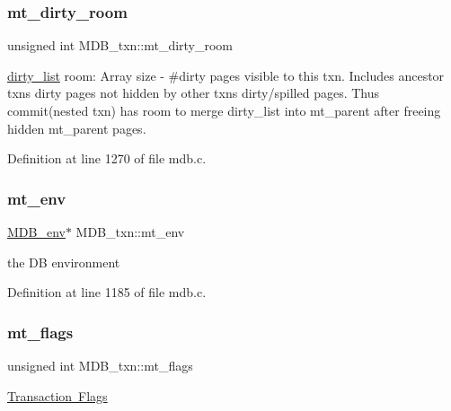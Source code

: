 \mbox{\label{struct_m_d_b__txn_ab62f1ad8141d56c66c8548934b7e0977}} 
\subsubsection{\texorpdfstring{mt\+\_\+dirty\+\_\+room}{mt\_dirty\_room}}
{\footnotesize\ttfamily unsigned int M\+D\+B\+\_\+txn\+::mt\+\_\+dirty\+\_\+room}

\mbox{\hyperlink{struct_m_d_b__txn_a0a89cc7b39f5aec84f629a2b43bb64d5}{dirty\+\_\+list}} room\+: Array size -\/ \#dirty pages visible to this txn. Includes ancestor txns\textquotesingle{} dirty pages not hidden by other txns\textquotesingle{} dirty/spilled pages. Thus commit(nested txn) has room to merge dirty\+\_\+list into mt\+\_\+parent after freeing hidden mt\+\_\+parent pages. 

Definition at line 1270 of file mdb.\+c.

\mbox{\label{struct_m_d_b__txn_a03c63e36f8e121d65172f1e5a1d70a55}} 
\subsubsection{\texorpdfstring{mt\+\_\+env}{mt\_env}}
{\footnotesize\ttfamily \mbox{\hyperlink{struct_m_d_b__env}{M\+D\+B\+\_\+env}}$\ast$ M\+D\+B\+\_\+txn\+::mt\+\_\+env}

the DB environment 

Definition at line 1185 of file mdb.\+c.

\mbox{\label{struct_m_d_b__txn_a6daba5db3d626e789a7d4c8ee3d8c840}} 
\subsubsection{\texorpdfstring{mt\+\_\+flags}{mt\_flags}}
{\footnotesize\ttfamily unsigned int M\+D\+B\+\_\+txn\+::mt\+\_\+flags}

\mbox{\hyperlink{group__mdb__txn}{Transaction Flags}} 

